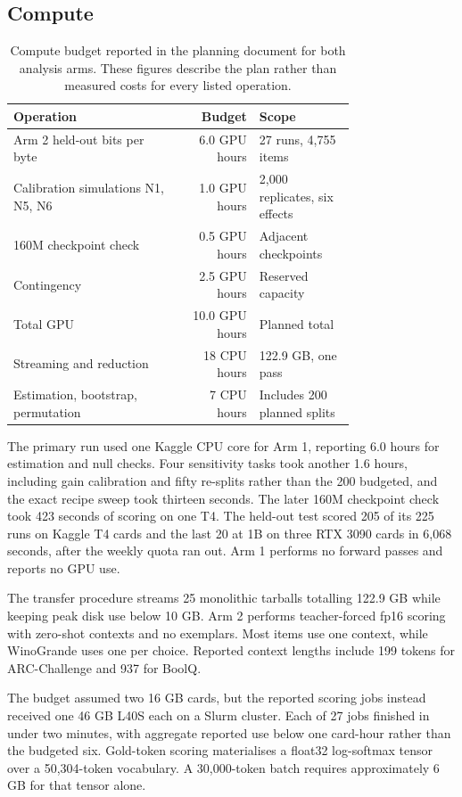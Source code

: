 \subsection{Compute}
\begin{table}[!htb]
\centering
\caption{Compute budget reported in the planning document for both analysis arms. These figures describe the plan rather than measured costs for every listed operation.}
\label{tab:original15}
\small\setlength{\tabcolsep}{4pt}\renewcommand{\arraystretch}{1.12}
\begin{tabular}{L{0.48\linewidth}rL{0.28\linewidth}}\toprule
Operation & Budget & Scope\\\midrule
Arm 2 held-out bits per byte & 6.0 GPU hours & 27 runs, 4,755 items\\
Calibration simulations N1, N5, N6 & 1.0 GPU hours & 2,000 replicates, six effects\\
160M checkpoint check & 0.5 GPU hours & Adjacent checkpoints\\
Contingency & 2.5 GPU hours & Reserved capacity\\
Total GPU & 10.0 GPU hours & Planned total\\
Streaming and reduction & 18 CPU hours & 122.9 GB, one pass\\
Estimation, bootstrap, permutation & 7 CPU hours & Includes 200 planned splits\\\bottomrule
\end{tabular}
\end{table}

The primary run used one Kaggle CPU core for Arm 1, reporting 6.0 hours for estimation and null checks. Four sensitivity tasks took another 1.6 hours, including gain calibration and fifty re-splits rather than the 200 budgeted, and the exact recipe sweep took thirteen seconds. The later 160M checkpoint check took 423 seconds of scoring on one T4. The held-out test scored 205 of its 225 runs on Kaggle T4 cards and the last 20 at 1B on three RTX 3090 cards in 6,068 seconds, after the weekly quota ran out. Arm 1 performs no forward passes and reports no GPU use.

The transfer procedure streams 25 monolithic tarballs totalling 122.9 GB while keeping peak disk use below 10 GB. Arm 2 performs teacher-forced fp16 scoring with zero-shot contexts and no exemplars. Most items use one context, while WinoGrande uses one per choice. Reported context lengths include 199 tokens for ARC-Challenge and 937 for BoolQ.

The budget assumed two 16 GB cards, but the reported scoring jobs instead received one 46 GB L40S each on a Slurm cluster. Each of 27 jobs finished in under two minutes, with aggregate reported use below one card-hour rather than the budgeted six. Gold-token scoring materialises a float32 log-softmax tensor over a 50,304-token vocabulary. A 30,000-token batch requires approximately 6 GB for that tensor alone.

